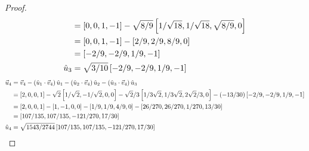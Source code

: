 \documentclass{tutorial}
\begin{document}
\begin{proof}
\begin{align*}
              &= \left[ 0, 0, 1,-1 \right] - \sqrt{8/9} \left[ 1/\sqrt{18}, 1/\sqrt{18}, \sqrt{8/9}, 0 \right] \\
              &= \left[ 0, 0, 1,-1 \right] - \left[ 2/9, 2/9, 8/9, 0 \right] \\
              &= \left[ -2/9, -2/9, 1/9, -1 \right] \\
  \hat{u}_3   &= \sqrt{3/10} \left[ -2/9, -2/9, 1/9, -1 \right]
\end{align*}
\begin{align*}
  \vec{u}_4   &= \vec{v}_4
                 - \left( \hat{u}_1 \cdot \vec{v}_4 \right) \hat{u}_1
                 - \left( \hat{u}_2 \cdot \vec{v}_4 \right) \hat{u}_2
                 - \left( \hat{u}_3 \cdot \vec{v}_4 \right) \hat{u}_3 \\
              &= \left[ 2,0,0,1 \right]
                 - \sqrt{2}   \left[ 1/\sqrt{2}, -1/\sqrt{2}, 0, 0 \right]
                 - \sqrt{2}/3 \left[ 1/3\sqrt{2}, 1/3\sqrt{2}, 2\sqrt{2}/3, 0 \right]
                 - (-13/30)   \left[ -2/9, -2/9, 1/9, -1 \right] \\
              &= \left[ 2,0,0,1 \right]
                 - \left[ 1, -1, 0, 0 \right]
                 - \left[ 1/9, 1/9, 4/9, 0 \right]
                 - \left[ 26/270, 26/270, 1/270, 13/30 \right] \\
              &= \left[ 107/135, 107/135, -121/270, 17/30 \right] \\
  \hat{u}_4   &= \sqrt{1543/2744} \left[ 107/135, 107/135, -121/270, 17/30 \right]
\end{align*}
\end{proof}\else \vspace{3in} \fi
\end{document}
